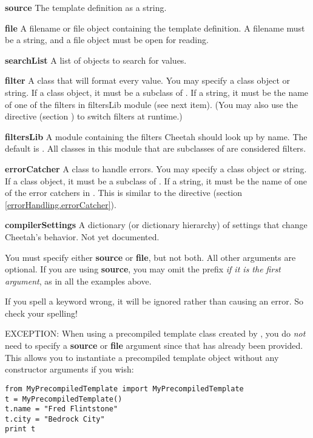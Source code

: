 \begin{description}
\item{{\bf source}}
     The template definition as a string.  
\item{{\bf file}}
     A filename or file object containing the template definition.
     A filename must be a string, and a file object must be open for reading.
\item{{\bf searchList}}
     A list of objects to search for  values.
\item{{\bf filter}}
     A class that will format every  value.  You may
     specify a class object or string.  If a class object,
     it must be a subclass of .  If a string, it
     must be the name of one of the filters in filtersLib module (see next 
     item).
     (You may also use the  directive (section
     \label{output.filter}) to switch filters at runtime.)
\item{{\bf filtersLib}}
     A module containing the filters Cheetah should look up by name.  The
     default is .  All classes in this module that are
     subclasses of  are considered filters.
\item{{\bf errorCatcher}}
     A class to handle  errors.  You may
     specify a class object or string.  If a class object,
     it must be a subclass of .  
     If a string, it must be the name of one of the error catchers in
     .  This is similar to the 
      directive 
     (section \ref{errorHandling.errorCatcher}).
\item{{\bf compilerSettings}}
     A dictionary (or dictionary hierarchy) of settings that change Cheetah's
     behavior.  Not yet documented.
\end{description}

You must specify either {\bf source} or {\bf file}, but not both.  All other
arguments are optional.  If you are using {\bf source}, you may omit the
 prefix {\em if it is the first argument}, as in all the examples
above.  

If you spell a keyword wrong, it will be ignored rather than causing an error.
So check your spelling!

EXCEPTION: When using a precompiled template class created by
, you do {\em not} need to specify a {\bf source} or {\bf
file} argument since that has already been provided.  This allows you to
instantiate a precompiled template object without any constructor arguments if
you wish:
\begin{verbatim}
from MyPrecompiledTemplate import MyPrecompiledTemplate
t = MyPrecompiledTemplate()
t.name = "Fred Flintstone"
t.city = "Bedrock City"
print t
\end{verbatim}

